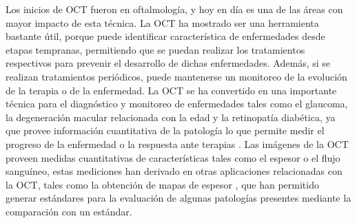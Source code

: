 Los inicios de OCT fueron en oftalmología, y hoy en día es una de las áreas con mayor impacto de esta técnica. La OCT ha mostrado ser una herramienta bastante útil, porque puede identificar característica de enfermedades desde etapas tempranas, permitiendo que se puedan realizar los tratamientos respectivos para prevenir el desarrollo de dichas enfermedades. Además, si se realizan tratamientos periódicos, puede mantenerse un monitoreo de la evolución de la terapia o de la enfermedad. La OCT se ha convertido en una importante técnica para el diagnóstico y monitoreo de enfermedades tales como el glaucoma, la degeneración macular relacionada con la edad y la retinopatía diabética, ya que provee información cuantitativa de la patología lo que permite medir el progreso de la enfermedad o la respuesta ante terapias \cite{Hee1998, Schuman1995,Schuman1996}. Las imágenes de la OCT proveen medidas cuantitativas de características tales como el espesor o el flujo sanguíneo, estas mediciones han derivado en otras aplicaciones relacionadas con la OCT, tales como la obtención de mapas de espesor \cite{Hee1998}, que han permitido generar estándares para la evaluación de algunas patologías presentes mediante la comparación con un estándar.


